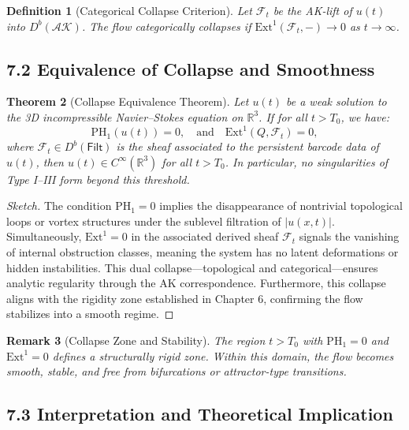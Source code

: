 \documentclass[11pt]{article}
\newtheorem{theorem}{Theorem}[section]
\newtheorem{definition}[theorem]{Definition}
\newtheorem{remark}[theorem]{Remark}
\begin{document}
\begin{definition}[Categorical Collapse Criterion]
Let $\mathcal{F}_t$ be the AK-lift of $u(t)$ into $D^b(\mathcal{AK})$. The flow categorically collapses if $\mathrm{Ext}^1(\mathcal{F}_t, -) \to 0$ as $t \to \infty$.
\end{definition}

\subsection{7.2 Equivalence of Collapse and Smoothness}

\begin{theorem}[Collapse Equivalence Theorem]
Let \( u(t) \) be a weak solution to the 3D incompressible Navier–Stokes equation on \( \mathbb{R}^3 \).  
If for all \( t > T_0 \), we have:
\[
\mathrm{PH}_1(u(t)) = 0, \quad \text{and} \quad \mathrm{Ext}^1(Q, \mathcal{F}_t) = 0,
\]
where \( \mathcal{F}_t \in D^b(\mathsf{Filt}) \) is the sheaf associated to the persistent barcode data of \( u(t) \),  
then \( u(t) \in C^\infty(\mathbb{R}^3) \) for all \( t > T_0 \).  
In particular, no singularities of Type I–III form beyond this threshold.
\end{theorem}

\begin{proof}[Sketch]
The condition $\mathrm{PH}_1 = 0$ implies the disappearance of nontrivial topological loops or vortex structures under the sublevel filtration of $|u(x,t)|$.  
Simultaneously, $\mathrm{Ext}^1 = 0$ in the associated derived sheaf $\mathcal{F}_t$ signals the vanishing of internal obstruction classes, meaning the system has no latent deformations or hidden instabilities.  
This dual collapse—topological and categorical—ensures analytic regularity through the AK correspondence.  
Furthermore, this collapse aligns with the rigidity zone established in Chapter 6, confirming the flow stabilizes into a smooth regime.
\end{proof}

\begin{remark}[Collapse Zone and Stability]
The region $t > T_0$ with $\mathrm{PH}_1 = 0$ and $\mathrm{Ext}^1 = 0$ defines a structurally rigid zone.  
Within this domain, the flow becomes smooth, stable, and free from bifurcations or attractor-type transitions.
\end{remark}

\subsection{7.3 Interpretation and Theoretical Implication}
\end{document}
